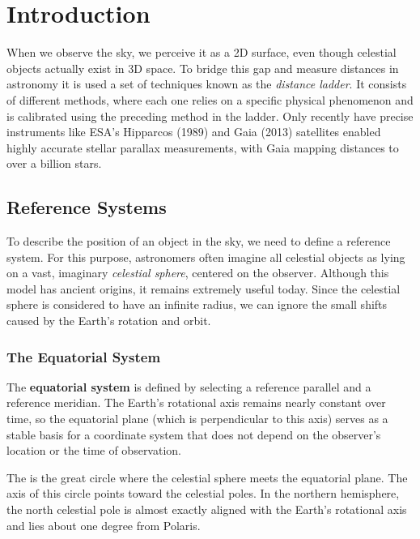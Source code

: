 \chapter{Introduction}

\vspace{-1em}

When we observe the sky, we perceive it as a 2D surface, even though celestial objects actually exist in 3D space. To bridge this gap and measure distances in astronomy it is used a set of techniques known as the \textit{distance ladder}. It consists of different methods, where each one relies on a specific physical phenomenon and is calibrated using the preceding method in the ladder. Only recently have precise instruments like ESA's Hipparcos (1989) and Gaia (2013) satellites enabled highly accurate stellar parallax measurements, with Gaia mapping distances to over a billion stars.

\vspace{-0.5em}

\section{Reference Systems}

To describe the position of an object in the sky, we need to define a reference system. For this purpose, astronomers often imagine all celestial objects as lying on a vast, imaginary \textit{celestial sphere}, centered on the observer. Although this model has ancient origins, it remains extremely useful today. Since the celestial sphere is considered to have an infinite radius, we can ignore the small shifts caused by the Earth's rotation and orbit.

   \subsection{The Equatorial System}

The \textbf{equatorial system} is defined by selecting a reference parallel and a reference meridian. The Earth's rotational axis remains nearly constant over time, so the equatorial plane (which is perpendicular to this axis) serves as a stable basis for a coordinate system that does not depend on the observer’s location or the time of observation.

The  is the great circle where the celestial sphere meets the equatorial plane. The axis of this circle points toward the celestial poles. In the northern hemisphere, the north celestial pole is almost exactly aligned with the Earth's rotational axis and lies about one degree from Polaris.


